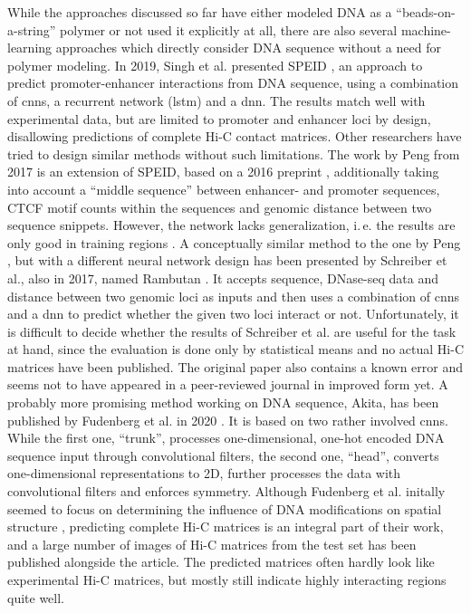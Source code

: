 While the approaches discussed so far have either modeled DNA as a ``beads-on-a-string'' polymer or not used it explicitly at all,
there are also several machine-learning approaches which directly consider DNA sequence without a need for polymer modeling.
In 2019, Singh et al. presented SPEID \cite{Singh2019}, an approach to predict promoter-enhancer interactions from DNA sequence,
using a combination of \acrshort{cnn}s, a recurrent network (\acrshort{lstm}) and a \acrshort{dnn}.
The results match well with experimental data, but are limited to promoter and enhancer loci by design, disallowing predictions of complete Hi-C contact matrices.
Other researchers have tried to design similar methods without such limitations.
The work by Peng from 2017 \cite{peng2017} is an extension of SPEID, based on a 2016 preprint \cite{Singh2016}, 
additionally taking into account a ``middle sequence'' between enhancer- and promoter sequences,
CTCF motif counts within the sequences and genomic distance between two sequence snippets. 
However, the network lacks generalization, i.\,e. the results are only good in training regions \cite[figs. 4, 5]{peng2017}.
A conceptually similar method to the one by Peng \cite{peng2017}, but with a different neural network design has been presented by Schreiber et al., also in 2017, 
named Rambutan \cite{Schreiber2017}.
It accepts sequence, DNase-seq data and distance between two genomic loci as inputs 
and then uses a combination of \acrshort{cnn}s and a \acrshort{dnn} to predict whether the given two loci interact or not. 
Unfortunately, it is difficult to decide whether the results of Schreiber et al. are useful for the task at hand, since the evaluation is done only by statistical means 
and no actual Hi-C matrices have been published.
The original paper \cite{Schreiber2017} also contains a known error and seems not to have appeared in a peer-reviewed journal in improved form 
yet. 
A probably more promising method working on DNA sequence, Akita, has been published by Fudenberg et al. in 2020 \cite{Fudenberg2020}.
It is based on two rather involved \acrlong{cnn}s. 
While the first one, ``trunk'', processes one-dimensional, one-hot encoded DNA sequence input through convolutional filters, the second one, ``head'', 
converts one-dimensional representations to 2D, further processes the data with convolutional filters and enforces symmetry.
Although Fudenberg et al. initally seemed to focus on determining the influence of DNA modifications on spatial structure \cite{Fudenberg2019},
predicting complete Hi-C matrices is an integral part of their work, 
and a large number of images of Hi-C matrices from the test set has been published alongside the article. 
The predicted matrices often hardly look like experimental Hi-C matrices, but mostly still indicate highly interacting regions quite well.

